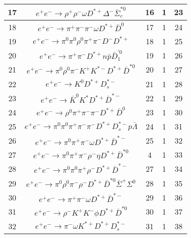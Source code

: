 \documentclass[landscape]{article}
\begin{document}
\begin{table}[htbp!]
\begin{tabular}{|c|c|c|c|c|}
\hline
17 & $ e^{+} e^{-} \rightarrow \rho^{+} \rho^{-} \omega D^{*+} \Delta^{-} \bar{\Sigma}_{c}^{*0} $ & 16 & 1 & 23 \\
\hline
18 & $ e^{+} e^{-} \rightarrow \pi^{+} \pi^{-} \pi^{-} \omega D^{*+} \bar{D}^{0} $ & 17 & 1 & 24 \\
\hline
19 & $ e^{+} e^{-} \rightarrow \pi^{0} \pi^{0} \rho^{0} \pi^{+} \pi^{-} D^{-} D^{*+} $ & 18 & 1 & 25 \\
\hline
20 & $ e^{+} e^{-} \rightarrow \pi^{+} \pi^{-} D^{*+} n \bar{p} \bar{D}_{1}^{\prime0} $ & 19 & 1 & 26 \\
\hline
21 & $ e^{+} e^{-} \rightarrow \pi^{0} \rho^{0} \pi^{-} K^{+} K^{*-} D^{*+} \bar{D}^{*0} $ & 20 & 1 & 27 \\
\hline
22 & $ e^{+} e^{-} \rightarrow K^{0} D^{*+} D_{s}^{*-} $ & 21 & 1 & 28 \\
\hline
23 & $ e^{+} e^{-} \rightarrow \bar{K}^{0} K^{*} D^{*+} \bar{D}^{*-} $ & 22 & 1 & 29 \\
\hline
24 & $ e^{+} e^{-} \rightarrow \rho^{0} \pi^{+} \pi^{-} \pi^{-} D^{*+} \bar{D}^{0} $ & 23 & 1 & 30 \\
\hline
25 & $ e^{+} e^{-} \rightarrow \pi^{0} \pi^{0} \pi^{+} \pi^{-} \pi^{-} D^{*+} D_{s}^{*-} p \bar{\Lambda} $ & 24 & 1 & 31 \\
\hline
26 & $ e^{+} e^{-} \rightarrow \pi^{0} \pi^{+} \pi^{-} \omega D^{*+} \bar{D}^{*-} $ & 25 & 1 & 32 \\
\hline
27 & $ e^{+} e^{-} \rightarrow \pi^{0} \pi^{+} \pi^{-} \rho^{-} \eta D^{*+} \bar{D}^{*0} $ & 4 & 1 & 33 \\
\hline
28 & $ e^{+} e^{-} \rightarrow \pi^{0} \pi^{0} \pi^{+} \rho^{-} D^{*+} \bar{D}^{*-} $ & 27 & 1 & 34 \\
\hline
29 & $ e^{+} e^{-} \rightarrow \pi^{0} \rho^{0} \pi^{-} \rho^{-} D^{*+} \bar{D}^{*0} \bar{\Sigma}^{+} \Sigma^{0} $ & 28 & 1 & 35 \\
\hline
30 & $ e^{+} e^{-} \rightarrow \pi^{+} \pi^{-} \omega D^{*+} \bar{D}^{*-} $ & 29 & 1 & 36 \\
\hline
31 & $ e^{+} e^{-} \rightarrow \rho^{-} K^{+} K^{-} \phi D^{*+} \bar{D}^{*0} $ & 30 & 1 & 37 \\
\hline
32 & $ e^{+} e^{-} \rightarrow \pi^{-} \omega K^{*+} D^{*+} D_{s}^{*-} $ & 31 & 1 & 38 \\
\hline
\end{tabular}
\end{table}

\clearpage
\end{document}
